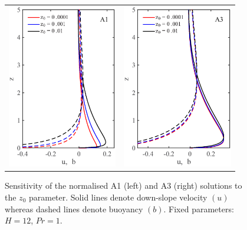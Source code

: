 \begin{figure}
    \begin{center}
    \begin{tabular}{c c}
    	\includegraphics[width= 48.0mm]{z0_sensitivity_plot.eps} &
	\includegraphics[width= 48.0mm]{z0_sensitivity_plot_grisogono.eps}
    \end{tabular}
    \caption{Sensitivity of the normalised A1 (left) and A3 (right) solutions to the $z_0$ parameter. Solid lines denote down-slope velocity $(u)$ whereas dashed lines denote buoyancy $(b)$. Fixed parameters: $H=12$, $Pr=1$.}
    \label{fig3}
    \end{center}
\end{figure}
%

